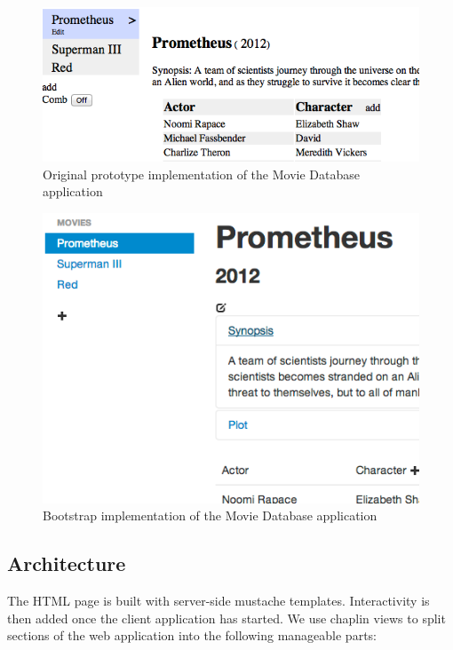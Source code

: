\documentclass[thesis.tex]{subfiles}
\begin{document}
\begin{figure}
	\centering
	\includegraphics[max width=\linewidth]{graphics/moviedb-prototype}
	\caption{Original prototype implementation of the Movie Database application}
	\label{fig:moviedb-prototype}
\end{figure}

\begin{figure}
	\centering
	\includegraphics[max width=\linewidth]{graphics/moviedb-bootstrap}
	\caption{Bootstrap implementation of the Movie Database application}
	\label{fig:moviedb-bootstrap}
\end{figure}

\subsection{Architecture}
The HTML page is built with server-side mustache templates. Interactivity is
then added once the client application has started.
We use chaplin views to split sections of the web application into the following
manageable parts:
\end{document}
